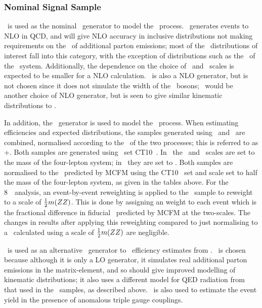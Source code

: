 \subsubsection{Nominal Signal Sample}
\label{sec:nominal-signal-sample}

\powhegbox\ is used as the nominal \mc\ generator to
model the \qqZZllll\ process.  \powhegbox\ generates events to NLO in QCD, and will give
NLO accuracy in inclusive distributions not making requirements on the \pt\
of additional parton emissions; most of the \ZZ\ distributions of interest fall
into this category, with the exception of distributions such as the \pt\ of the
\ZZ\ system.  Additionally, the dependence on the choice of \fact\ and \renorm\
scales is expected to be smaller for a NLO calculation. \mcatnlo\ is also a
NLO generator, but is not chosen since it does not simulate the width of
the \Z\ bosons; \herwigPP\ would be another choice of NLO generator, but is seen
to give similar kinematic distributions to \powhegbox.

In addition, the \ggtwoZZ\ generator
is used to model the \ggZZllll\ process. When estimating efficiencies and expected
distributions, the samples generated using \powhegbox\ and \ggtwoZZ\ are combined,
normalised according to the \cx\ of the two processes; this is referred to as
\powhegbox+\ggtwoZZ. Both samples are generated using \partDF\ set
CT10~\cite{CT10}. In \powhegbox\ the \fact\ and \renorm\ scales are set to the
mass of the four-lepton system; in \ggtwoZZ\ they are set to \mZ. Both
samples are normalised to the \cx\ predicted by MCFM using the CT10 \partDF\ set
and scale set to half the mass of the four-lepton system, as given in the tables
above. For the 8~\tev\ analysis, an event-by-event reweighting is applied to the
\powhegbox\ sample to reweight to a scale of $\frac{1}{2}m(ZZ)$. This is done by assigning an weight to each
event which is the fractional difference in fiducial \cx\ predicted by MCFM at
the two-scales. The changes in results after applying this reweighting compared to
just normalising to a \cx\ calculated using a scale of $\frac{1}{2}m(ZZ)$ are
negligible.

\sherpa\ is used as an alternative \mc\ generator to \crosscheck\ efficiency
estimates from \powhegbox. \sherpa\ is chosen because although it is only a LO
generator, it simulates real additional parton emissions in the matrix-element,
and so should give improved modelling of kinematic distributions; it also uses a
different model for QED radiation from that used in the \powhegbox\ samples, as
described above. \sherpa\ is also used to estimate the event
yield in the presence of anomalous triple gauge couplings. 

